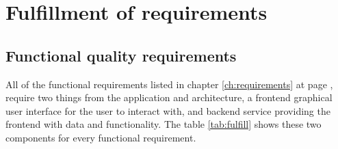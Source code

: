 \section{Fulfillment of requirements}

\subsection{Functional quality requirements}
All of the functional requirements listed in chapter \ref{ch:requirements} at page \pageref{ch:requirements}, require two things from the application and architecture, a frontend graphical user interface for the user to interact with, and backend service providing the frontend with data and functionality. The table \ref{tab:fulfill} shows these two components for every functional requirement.
